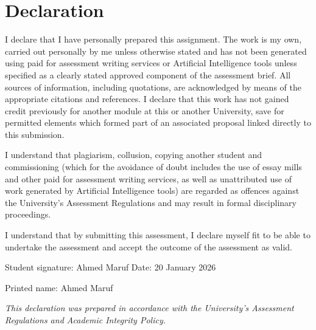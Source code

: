 
\chapter*{Declaration}

\vspace{1cm}

I declare that I have personally prepared this assignment. The work is my own, carried out personally by me unless otherwise stated and has not been generated using paid for assessment writing services or Artificial Intelligence tools unless specified as a clearly stated approved component of the assessment brief. All sources of information, including quotations, are acknowledged by means of the appropriate citations and references. I declare that this work has not gained credit previously for another module at this or another University, save for permitted elements which formed part of an associated proposal linked directly to this submission.

\vspace{1cm}

I understand that plagiarism, collusion, copying another student and commissioning (which for the avoidance of doubt includes the use of essay mills and other paid for assessment writing services, as well as unattributed use of work generated by Artificial Intelligence tools) are regarded as offences against the University's Assessment Regulations and may result in formal disciplinary proceedings.

\vspace{1cm}

I understand that by submitting this assessment, I declare myself fit to be able to undertake the assessment and accept the outcome of the assessment as valid.

\vspace{2cm}

\noindent
Student signature: Ahmed Maruf \quad Date: 20 January 2026

\vspace{0.5cm}

\noindent
Printed name: Ahmed Maruf

\vspace{2cm}

\noindent
\textit{This declaration was prepared in accordance with the University's Assessment Regulations and Academic Integrity Policy.}

